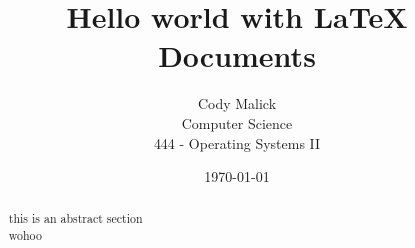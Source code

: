 \documentclass{article}
\begin{document}
\title{Hello world with \LaTeX{} Documents}
\author{Cody Malick\\
  Computer Science\\
  444 - Operating Systems II}
\date{\today}
\maketitle

\begin{abstract}
this is an abstract section\\
wohoo
\end{abstract}
\end{document}
